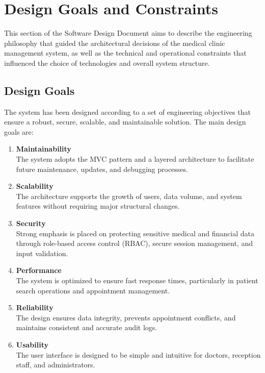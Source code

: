 \section{Design Goals and Constraints}

This section of the Software Design Document aims to describe the engineering philosophy that guided the architectural decisions of the medical clinic management system, as well as the technical and operational constraints that influenced the choice of technologies and overall system structure.

\subsection{Design Goals}

The system has been designed according to a set of engineering objectives that ensure a robust, secure, scalable, and maintainable solution. The main design goals are:

\begin{enumerate}
	\item \textbf{Maintainability} \\
	The system adopts the MVC pattern and a layered architecture to facilitate future maintenance, updates, and debugging processes.
	
	\item \textbf{Scalability} \\
	The architecture supports the growth of users, data volume, and system features without requiring major structural changes.
	
	\item \textbf{Security} \\
	Strong emphasis is placed on protecting sensitive medical and financial data through role-based access control (RBAC), secure session management, and input validation.
	
	\item \textbf{Performance} \\
	The system is optimized to ensure fast response times, particularly in patient search operations and appointment management.
	
	\item \textbf{Reliability} \\
	The design ensures data integrity, prevents appointment conflicts, and maintains consistent and accurate audit logs.
	
	\item \textbf{Usability} \\
	The user interface is designed to be simple and intuitive for doctors, reception staff, and administrators.
\end{enumerate}

